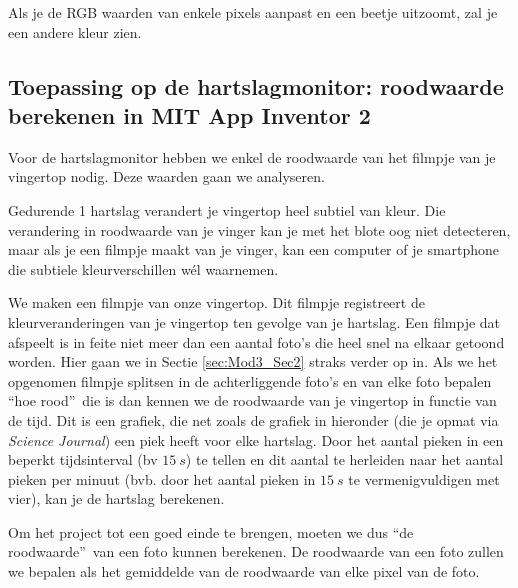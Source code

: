 Als je de RGB waarden van enkele pixels aanpast en een beetje uitzoomt, zal je een andere kleur zien.


\subsection{Toepassing op de hartslagmonitor: roodwaarde berekenen in MIT App Inventor 2}

Voor de hartslagmonitor hebben we enkel de roodwaarde van het filmpje van je vingertop nodig. Deze waarden gaan we analyseren.

Gedurende 1 hartslag verandert je vingertop heel subtiel van kleur. 
Die verandering in roodwaarde van je vinger kan je met het blote oog niet detecteren, maar als je een filmpje maakt van je vinger, kan een computer of je smartphone die subtiele kleurverschillen w\'el waarnemen.

We maken een filmpje van onze vingertop. Dit filmpje registreert de kleurveranderingen van je vingertop ten gevolge van je hartslag. Een filmpje dat afspeelt is in feite niet meer dan een aantal foto's die heel snel na elkaar getoond worden. Hier gaan we in Sectie \ref{sec:Mod3_Sec2} straks verder op in. Als we het opgenomen filmpje splitsen in de achterliggende foto's en van elke foto bepalen \textquotedblleft hoe rood\textquotedblright \  die is dan kennen we de roodwaarde van je vingertop in functie van de tijd. Dit is een grafiek, die net zoals de grafiek in hieronder (die je opmat via \emph{Science Journal}) een piek heeft voor elke hartslag. Door het aantal pieken in een beperkt tijdsinterval (bv $15~s$) te tellen en dit aantal te herleiden naar het aantal pieken per minuut (bvb. door het aantal pieken in $15~s$ te vermenigvuldigen met vier), kan je de hartslag berekenen.


Om het project tot een goed einde te brengen, moeten we dus \textquotedblleft de roodwaarde\textquotedblright\  van een foto kunnen berekenen. 
De roodwaarde van een foto zullen we bepalen als het gemiddelde van de roodwaarde van elke pixel van de foto.


